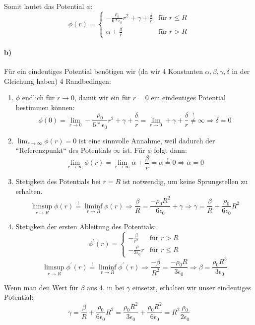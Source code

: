 \documentclass[a4paper]{article}
\newcommand{\epszero}{\epsilon_0}
\begin{document}
Somit lautet das Potential $\phi$:
\[
	\phi(r) =
	\begin{cases}
		-\frac{\rho_0}{6 * \epszero} r^2 + \gamma + \frac\delta r
		&\text{für } r \leq R \\
		\alpha + \frac\beta r 
		&\text{für } r > R
	\end{cases}
\]

\newpage
\paragraph{b)}
Für ein eindeutiges Potential benötigen wir (da wir 4 Konstanten $\alpha, \beta, \gamma, \delta$ in der Gleichung haben) 4 Randbedingen:
\begin{enumerate}
	\item $\phi$ endlich für $r\rightarrow 0$, damit wir ein für $r=0$ 
		ein eindeutiges Potential bestimmen können:
		\[
			\phi(0) = \lim_{r\rightarrow0} 
			-\frac{\rho_0}{6 * \epszero} r^2 
			+ \gamma 
			+ \frac\delta r
			= \lim_{r\rightarrow0} + \gamma
			+ \frac\delta r \overset{!}{\neq} \infty
			\Rightarrow
			\delta = 0
		\]
	\item $\lim_{r\rightarrow\infty} \phi(r) = 0$ ist eine sinnvolle 
		Annahme, weil dadurch der ``Referenzpunkt`` des Potentials 
		$\infty$ ist. Für $\phi$ folgt dann:
		\[
			\lim_{r\rightarrow\infty}
			\phi(r) 
			= \lim_{r\rightarrow\infty}
			\alpha + \frac\beta r 
			= \alpha 
			\overset{!}{=} 0
			\Rightarrow
			\alpha = 0
			\]
	\item Stetigkeit des Potentials bei $r = R$ ist notwendig, um keine
		Sprungstellen zu erhalten.
		\[
			\limsup_{r\rightarrow R} \phi(r)
			\overset{!}{=}
			\liminf_{r\rightarrow R} \phi(r)
			\Rightarrow
			\frac{\beta}{R} = 
			\frac{-\rho_0 R^2}{6 \epszero} + \gamma
			\Rightarrow
			\gamma = 
			\frac\beta R + \frac{\rho_0}{6 \epszero} R^2
		\]
	\item Stetigkeit der ersten Ableitung des Potentials:
		\[
			\phi^\prime(r) = 
			\begin{cases}
				-\frac{\beta}{r^2}
				&\text{für } r > R \\
				-\frac{\rho}{3\epszero} r
				&\text{für } r \leq R
			\end{cases}
		\]
		\[
			\limsup_{r\rightarrow R} \phi^\prime(r)
			\overset{!}{=}
			\liminf_{r\rightarrow R} \phi^\prime(r)
			\Rightarrow
			\frac{-\beta}{R^2} =
			\frac{-\rho_0 R}{3 \epszero}
			\Rightarrow
			\beta
			=
			\frac{\rho_0 R^3}{3 \epszero}
		\]
\end{enumerate}
Wenn man den Wert für $\beta$ aus 4. in bei $\gamma$ einsetzt, erhalten wir
unser eindeutiges Potential:
\[
	\gamma = \frac\beta R + \frac{\rho_0}{6 \epszero} R^2
	=
	\frac{\rho_0 R^2}{3 \epszero} + 
	\frac{\rho_0 R^2}{6 \epszero}
	= 
	R^2 \frac{\rho_0}{2 \epszero}
\]
\end{document}
